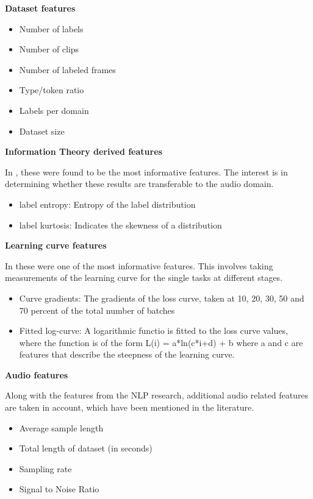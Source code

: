 	\textbf{Dataset features}
	\begin{itemize}
		\item Number of labels
		\item Number of clips
		\item Number of labeled frames
		\item Type/token ratio
		\item Labels per domain
		\item Dataset size
	\end{itemize}
	
	\textbf{Information Theory derived features}
	
	In \citet{alonso2016multitask}, these were found to be the most informative features. The interest is in determining whether these results are transferable to the audio domain.
	\begin{itemize}
		\item label entropy: Entropy of the label distribution
		\item label kurtosis: Indicates the skewness of a distribution
	\end{itemize}
	
	\textbf{Learning curve features}
	
	In \citet{bingel2017identifying} these were one of the most informative features. This involves taking measurements of the learning curve for the single tasks at different stages.
	\begin{itemize}
		\item Curve gradients: The gradients of the loss curve, taken at 10, 20, 30, 50 and 70 percent of the total number of batches
		\item Fitted log-curve: A logarithmic functio is fitted to the loss curve values, where the function is of the form L(i) = a*ln(c*i+d) + b where a and c are features that describe the steepness of the learning curve.
	\end{itemize}		
	
	\textbf{Audio features}
	
	Along with the features from the NLP research, additional audio related features are taken in account, which have been mentioned in the literature.
	\begin{itemize}
		\item Average sample length
		\item Total length of dataset (in seconds)
		\item Sampling rate
		\item Signal to Noise Ratio
	\end{itemize}
	
